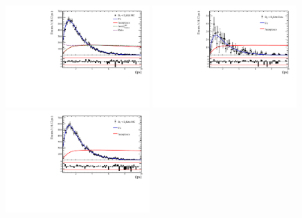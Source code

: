 \begin{figure}[h]
\includegraphics[height=!,width=0.49\textwidth]{figs/Acceptance/adaptive_N4/timeAccRatioFit_norm_MC_Run2_t1.pdf}
\includegraphics[height=!,width=0.49\textwidth]{figs/Acceptance/adaptive_N4/timeAccRatioFit_signal_B0_Run2_t1.pdf}
\includegraphics[height=!,width=0.49\textwidth]{figs/Acceptance/adaptive_N4/timeAccRatioFit_signal_MC_Run2_t1.pdf}
\caption{}
\label{fig:}
\end{figure}
